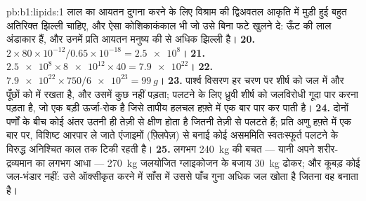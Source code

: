 \begin{solution}{pb:b1:lipids:1}
लाल  का आयतन दुगना करने के लिए विश्राम की द्विअवतल आकृति में मुड़ी
हुई बहुत अतिरिक्त झिल्ली चाहिए, और ऐसा कोशिकाकंकाल भी जो उसे बिना फटे
खुलने दे: ऊँट की लाल  अंडाकार हैं, और उनमें प्रति आयतन मनुष्य की
 से अधिक झिल्ली है।
\textbf{20.} $2\times 80\times 10^{-12}/0.65\times 10^{-18} = \num{2.5e8}$।
\textbf{21.} $\num{2.5e8}\times\num{8e12}\times 40 = \num{7.9e22}$।
\textbf{22.} $\num{7.9e22}\times 750/\num{6e23} = \qty{99}{g}$।
\textbf{23.} पार्श्व विसरण हर चरण पर शीर्ष को जल में और पूँछों को  में
रखता है, और उसमें कुछ नहीं पड़ता; पलटने के लिए ध्रुवी शीर्ष को
जलविरोधी गूदा पार करना पड़ता है, जो एक बड़ी ऊर्जा-रोक है जिसे तापीय
हलचल हफ़्ते में एक बार पार कर पाती है।
\textbf{24.} दोनों पर्णों के बीच कोई अंतर उतनी ही तेज़ी से क्षीण होता है
जितनी तेज़ी से  पलटते हैं; प्रति अणु हफ़्ते में एक बार पर, विशिष्ट
 आरपार ले जाते एंजाइमों (फ़्लिपेज़) से बनाई कोई असममिति स्वतःस्फूर्त
पलटने के विरुद्ध अनिश्चित काल तक टिकी रहती है।
\textbf{25.} लगभग \qty{240}{kg} की बचत --- यानी अपने शरीर-द्रव्यमान का
लगभग आधा --- \qty{270}{kg} जलयोजित ग्लाइकोजन के बजाय \qty{30}{kg} 
ढोकर; और कूबड़ कोई जल-भंडार नहीं: उसे ऑक्सीकृत करने में साँस में उससे
पाँच गुना अधिक जल खोता है जितना वह बनाता है।
\end{solution}
